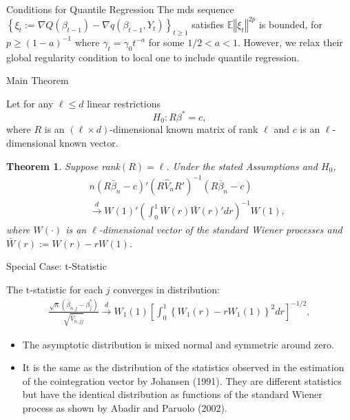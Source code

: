\documentclass[beamer, t]{beamer}
\newtheorem{thm}{Theorem}[section]
\begin{document}
\begin{frame}{Conditions for Quantile Regression}
{	The mds sequence $\left\{ \xi_{t}:=\nabla Q\left(\beta_{t-1}\right)-\nabla q\left(\beta_{t-1},Y_{t}\right) \right\}_{t\geq1}$ satisfies
	$\mathbb{E}\left\Vert \xi_{t}\right\Vert ^{2p}$
	is bounded, for $p\geq\left(1-a\right)^{-1}$ where $\gamma_{t}=\gamma_0 t^{-a} $ for some $1/2 < a <1$. However, we relax their global regularity condition to local one to include quantile regression.
}
	
\end{frame}


 \begin{frame}{Main Theorem}

Let for any $\ell \leq d$ linear restrictions
\[
H_{0}: R\beta^{*} = c,
\]
where $R$ is  an $(\ell \times d)$-dimensional known matrix of  rank $\ell$
and
$c$ is an $\ell$-dimensional known vector.
\begin{thm}
\label{thm:Wald} Suppose rank$(R)=\ell$. Under the stated  Assumptions and $H_{0}$,
\begin{eqnarray*}
&&n\left(R\bar{\beta}_{n}-c\right)'\left(R\widehat{V}_{n}R'\right)^{-1}\left(R\bar{\beta}_{n}-c\right)\\
&& \overset{d}{\to}W\left(1\right)'\left(\int_{0}^{1}\bar{W}(r)\bar{W}(r)'dr\right)^{-1}W\left(1\right),
\end{eqnarray*}
where $W(\cdot)$ is an $\ell$-dimensional vector of the standard Wiener
processes and $\bar{W}\left(r\right):=W\left(r\right)-rW\left(1\right)$.
\end{thm}

\end{frame}


\begin{frame}{Special Case: t-Statistic}

The t-statistic for each $ j $ converges in distribution:
\begin{align*}\label{t-stat-limit}
\frac{\sqrt{n}\left(\bar{\beta}_{n,j}-\beta_{j}^{*}\right)}{\sqrt{\widehat{V}_{n,jj}}}
\overset{d}{\to}
W_1\left(1\right)  \left[ \int_{0}^{1} \left\{ W_1\left(r\right)-rW_1\left(1\right) \right\}^2 dr\right]^{-1/2},
\end{align*}

 \begin{itemize}
 	\item 
 	The asymptotic distribution is mixed normal and symmetric around zero.
 	
 	\item It  is the same as the distribution of the statistics observed in the estimation of the cointegration vector by Johansen  (1991). They are different statistics but have the identical distribution as functions of the standard Wiener process as shown by Abadir and Paruolo (2002).
 	
 \end{itemize}

\end{frame}
\end{document}
